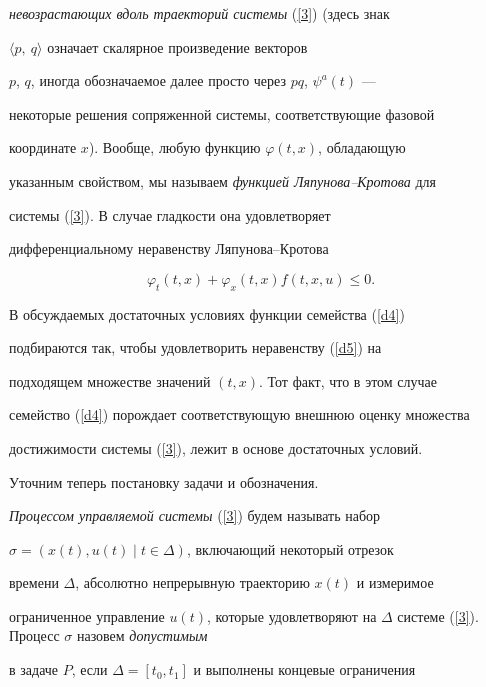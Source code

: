 {\em невозрастающих вдоль траекторий системы} (\ref{3}) (здесь знак


$\langle p,~q \rangle $ означает скалярное произведение векторов


$p$, $q$, иногда обозначаемое далее просто через $pq$, $\psi^a (t)$ ---


некоторые решения сопряженной системы, соответствующие фазовой


координате $x$). Вообще, любую функцию $\varphi (t,x)$, обладающую


указанным свойством, мы называем {\em функцией Ляпунова--Кротова} для


системы (\ref{3}). В случае гладкости она удовлетворяет {\em


дифференциальному неравенству Ляпунова--Кротова}


\begin{equation}


\varphi_t (t,x)+\varphi_x (t,x)f(t,x,u)\leq 0.


\label{d5}


\end{equation}


В обсуждаемых достаточных условиях функции семейства (\ref{d4})


подбираются так, чтобы удовлетворить неравенству (\ref{d5}) на


подходящем множестве значений $(t,x)$. Тот факт, что в этом случае


семейство (\ref{d4}) порождает соответствующую внешнюю оценку множества


достижимости системы (\ref{3}), лежит в основе достаточных условий.





Уточним теперь постановку задачи и обозначения.





{\em Процессом управляемой системы} (\ref{3}) будем называть набор


$\sigma =(x(t),u(t)\mid t\in\Delta)$, включающий некоторый отрезок


времени $\Delta $, абсолютно непрерывную траекторию $x(t)$ и измеримое


ограниченное управление $u(t)$, которые удовлетворяют на $\Delta


$ системе (\ref{3}). Процесс $\sigma $ назовем {\em допустимым}


в задаче $P$, если $\Delta =[t_0, t_1 ]$ и выполнены концевые ограничения


